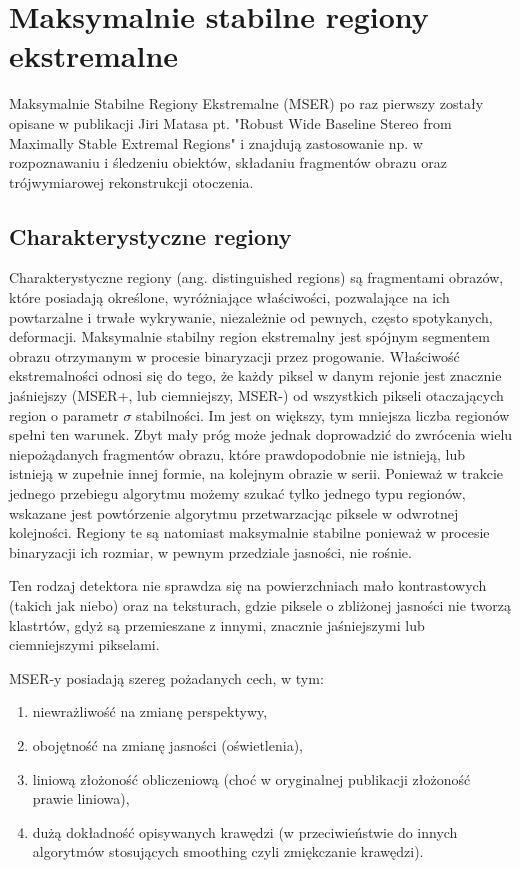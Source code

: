 \chapter{Maksymalnie stabilne regiony ekstremalne}

Maksymalnie Stabilne Regiony Ekstremalne (MSER) po raz pierwszy zostały opisane
w publikacji Jiri Matasa pt. "Robust Wide Baseline Stereo from Maximally Stable
Extremal Regions" \cite{matas02} i znajdują zastosowanie np. w rozpoznawaniu i
śledzeniu obiektów, składaniu fragmentów obrazu oraz trójwymiarowej
rekonstrukcji otoczenia.

\section{Charakterystyczne regiony}

Charakterystyczne regiony (ang. distinguished regions) są fragmentami obrazów,
które posiadają określone, wyróżniające właściwości, pozwalające na ich
powtarzalne i trwałe wykrywanie, niezależnie od pewnych, często spotykanych,
deformacji. Maksymalnie stabilny region ekstremalny jest spójnym segmentem
obrazu otrzymanym w procesie binaryzacji przez progowanie. Właściwość
ekstremalności odnosi się do tego, że każdy piksel w danym rejonie jest
znacznie jaśniejszy (MSER+, lub ciemniejszy, MSER-) od wszystkich pikseli
otaczających region o parametr $\sigma$ stabilności. Im jest on większy, tym
mniejsza liczba regionów spełni ten warunek. Zbyt mały próg może jednak
doprowadzić do zwrócenia wielu niepożądanych fragmentów obrazu, które
prawdopodobnie nie istnieją, lub istnieją w zupełnie innej formie, na kolejnym
obrazie w serii.  Ponieważ w trakcie jednego przebiegu algorytmu możemy szukać
tylko jednego typu regionów, wskazane jest powtórzenie algorytmu przetwarzacjąc
piksele w odwrotnej kolejności. Regiony te są natomiast maksymalnie stabilne
ponieważ w procesie binaryzacji ich rozmiar, w pewnym przedziale jasności, nie
rośnie.

Ten rodzaj detektora nie sprawdza się na powierzchniach mało kontrastowych
(takich jak niebo) oraz na teksturach, gdzie piksele o zbliżonej jasności nie
tworzą klastrtów, gdyż są przemieszane z innymi, znacznie jaśniejszymi lub
ciemniejszymi pikselami.

MSER-y posiadają szereg pożadanych cech, w tym:

\begin{enumerate} \item niewrażliwość na zmianę perspektywy, \item obojętność
    na zmianę jasności (oświetlenia), \item liniową złożoność obliczeniową
    (choć w oryginalnej publikacji złożoność prawie liniowa), \item dużą
    dokładność opisywanych krawędzi (w przeciwieństwie do innych algorytmów
    stosujących smoothing czyli zmiękczanie krawędzi).  \end{enumerate}

